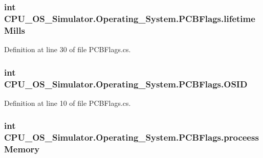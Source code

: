\subsubsection[{lifetime\+Mills}]{\setlength{\rightskip}{0pt plus 5cm}int C\+P\+U\+\_\+\+O\+S\+\_\+\+Simulator.\+Operating\+\_\+\+System.\+P\+C\+B\+Flags.\+lifetime\+Mills}\label{struct_c_p_u___o_s___simulator_1_1_operating___system_1_1_p_c_b_flags_a8079f3c5421cf89d5019718f857b4c7e}


Definition at line 30 of file P\+C\+B\+Flags.\+cs.

\hypertarget{struct_c_p_u___o_s___simulator_1_1_operating___system_1_1_p_c_b_flags_ac8d5b519b8ac16523a5ec55ab8817f46}{}
\subsubsection[{O\+S\+I\+D}]{\setlength{\rightskip}{0pt plus 5cm}int C\+P\+U\+\_\+\+O\+S\+\_\+\+Simulator.\+Operating\+\_\+\+System.\+P\+C\+B\+Flags.\+O\+S\+I\+D}\label{struct_c_p_u___o_s___simulator_1_1_operating___system_1_1_p_c_b_flags_ac8d5b519b8ac16523a5ec55ab8817f46}


Definition at line 10 of file P\+C\+B\+Flags.\+cs.

\hypertarget{struct_c_p_u___o_s___simulator_1_1_operating___system_1_1_p_c_b_flags_a4248a993bf5be874fcd2843269bb9058}{}
\subsubsection[{proceess\+Memory}]{\setlength{\rightskip}{0pt plus 5cm}int C\+P\+U\+\_\+\+O\+S\+\_\+\+Simulator.\+Operating\+\_\+\+System.\+P\+C\+B\+Flags.\+proceess\+Memory}\label{struct_c_p_u___o_s___simulator_1_1_operating___system_1_1_p_c_b_flags_a4248a993bf5be874fcd2843269bb9058}


